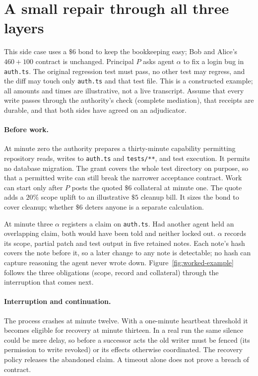 \documentclass[11pt,a4paper]{article}
\theoremstyle{definition}
\theoremstyle{remark}
\begin{document}
\section{A small repair through all three layers}\label{app:worked}
This side case uses a $\$6$ bond to keep the bookkeeping easy; Bob and
Alice's $460+100$ contract is unchanged. Principal $P$ asks agent $\alpha$ to
fix a login bug in \texttt{auth.ts}. The original regression test must pass,
no other test may regress, and the diff may touch only \texttt{auth.ts} and
that test file. This is a constructed example; all amounts and times are
illustrative, not a live transcript. Assume that every write passes through
the authority's check (complete mediation), that receipts are durable, and
that both sides have agreed on an adjudicator.

\paragraph{Before work.}
At minute zero the authority prepares a thirty-minute capability permitting
repository reads, writes to \texttt{auth.ts} and \texttt{tests/**}, and test
execution. It permits no database migration. The grant covers the whole test
directory on purpose, so that a permitted write can still break the narrower
acceptance contract. Work can start only after $P$ posts the quoted $\$6$
collateral at minute one. The quote adds a $20\%$ scope uplift to an
illustrative $\$5$ cleanup bill. It sizes the bond to cover cleanup; whether
$\$6$ deters anyone is a separate calculation.

At minute three $\alpha$ registers a claim on \texttt{auth.ts}. Had another
agent held an overlapping claim, both would have been told and neither locked
out. $\alpha$ records its scope, partial patch and test output in five
retained notes. Each note's hash covers the note before it, so a later change
to any note is detectable; no hash can capture reasoning the agent never wrote
down. Figure~\ref{fig:worked-example} follows the three obligations (scope,
record and collateral) through the interruption that comes next.



\paragraph{Interruption and continuation.}
The process crashes at minute twelve. With a one-minute heartbeat threshold
it becomes eligible for recovery at minute thirteen. In a real run the same
silence could be mere delay, so before a successor acts the old writer must
be fenced (its permission to write revoked) or its effects otherwise
coordinated. The recovery policy releases the abandoned claim. A timeout alone
does not prove a breach of contract.
\end{document}
